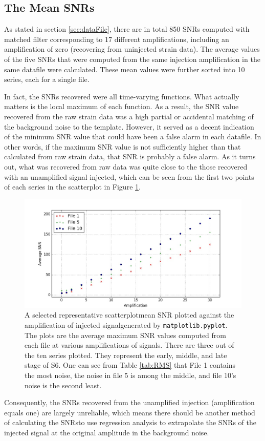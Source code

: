 \documentclass[aps,prd,preprint]{revtex4}
\begin{document}
\subsection{The Mean SNRs \label{sec:SNR}}
As stated in section \ref{sec:dataFile}, there are in total 850 SNRs computed with matched filter corresponding to 17 different amplifications, including an amplification of zero (recovering from uninjected strain data). The average values of the five SNRs that were computed from the same injection amplification in the same datafile were calculated. These mean values were further sorted into 10 series, each for a single file.
\par In fact, the SNRs recovered were all time-varying functions. What actually matters is the local maximum of each function. As a result, the SNR value recovered from the raw strain data was a high partial or accidental matching of the background noise to the template. However, it served as a decent indication of the minimum SNR value that could have been a false alarm in each datafile. In other words, if the maximum SNR value is not sufficiently higher than that calculated from raw strain data, that SNR is probably a false alarm. As it turns out, what was recovered from raw data was quite close to the those recovered with an unamplified signal injected, which can be seen from the first two points of each series in the scatterplot in Figure \ref{fig:SNRs}.
\begin{figure}
	\includegraphics[scale = 0.4]{SNRs}
	\caption{A selected representative scatterplot\textemdash mean SNR plotted against the amplification of injected signal\textemdash generated by \texttt{matplotlib.pyplot}. The plots are the average maximum SNR values computed from each file at various amplifications of signals. There are three out of the ten series plotted. They represent the early, middle, and late stage of S6. One can see from Table \ref{tab:RMS} that File 1 contains the most noise, the noise in file 5 is among the middle, and file 10's noise is the second least. \label{fig:SNRs}}
\end{figure}
\par Consequently, the SNRs recovered from the unamplified injection (amplification equals one) are largely unreliable, which means there should be another method of calculating the SNRs\textemdash to use regression analysis to extrapolate the SNRs of the injected signal at the original amplitude in the background noise.
\end{document}
